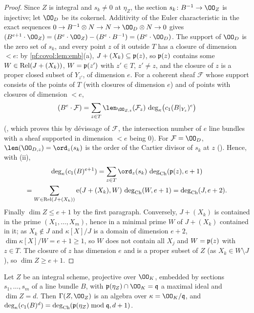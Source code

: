 \begin{proof}
Since $Z$ is integral and $s_k\ne0$ at $\eta_Z$, the section $s_k\colon B^{-1}\to\OO_Z$ is injective; let
$\OO_D$ be its cokernel. Additivity of the Euler characteristic in the exact sequences
$0\to B^{-1}\otimes N\to N\to\OO_D\otimes N\to0$ gives
$(B^{e+1}\cdot\OO_Z)=(B^e\cdot\OO_Z)-(B^e\cdot B^{-1})=(B^e\cdot\OO_D)$. The support of $\OO_D$ is the zero
set of $s_k$, and every point $z$ of it outside $T$ has a closure of dimension $<e$: by
\cref{pf:covol:lem:emb}(a), $J+(X_k)\subseteq\mathfrak{p}(z)$, so $\mathfrak{p}(z)$ contains some
$W\in\operatorname{Rel}(J+(X_k))$, $W=\mathfrak{p}(z')$ with $z'\in T$, $z'\ne z$, and the closure of $z$ is a proper
closed subset of $Y_{z'}$, of dimension $e$. For a coherent sheaf $\mathcal F$ whose support consists of
the points of $T$ (with closures of dimension $e$) and of points with closures of dimension $<e$,
\[
(B^e\cdot\mathcal F)=\sum_{z\in T}\len_{\OO_{Z,z}}(\mathcal F_z)\,\deg_\kappa\bigl(c_1(B|_{Y_z})^e\bigr)
\]
(, which proves this by d\'evissage of
$\mathcal F$, the intersection number of $e$ line bundles with a sheaf supported in dimension $<e$
being $0$). For $\mathcal F=\OO_D$, $\len(\OO_{D,z})=\ord_z(s_k)$ is the order of the Cartier divisor
of $s_k$ at $z$ (). Hence, with (ii),
\begin{multline*}
\deg_\kappa(c_1(B)^{e+1})=\sum_{z\in T}\ord_z(s_k)\,\covolCdeg(\covolPt(z),e+1)\\
=\sum_{W\in\covolRel(J+(X_k))}\covolLm(J+(X_k),W)\,\covolCdeg(W,e+1)=\covolCdeg(J,e+2).
\end{multline*}
Finally $\dim Z\le e+1$ by the first paragraph. Conversely, $J+(X_k)$ is contained in the prime
$(X_1,\dots,X_m)$, hence in a minimal prime $W$ of $J+(X_k)$ contained in it; as $X_k\notin J$ and
$\kappa[X]/J$ is a domain of dimension $e+2$, $\dim\kappa[X]/W=e+1\ge1$, so $W$ does not contain all
$X_j$ and $W=\mathfrak{p}(z)$ with $z\in T$. The closure of $z$ has dimension $e$ and is a proper subset of
$Z$ (as $X_k\in W\setminus J$), so $\dim Z\ge e+1$.
\end{proof}

\begin{proposition}\label{pf:covol:prop:vert}
Let $Z$ be an integral scheme, projective over $\OO_K$, embedded by sections $s_1,\dots,s_m$ of a line
bundle $B$, with $\covolPt(\eta_Z)\cap\OO_K=\mathfrak q$ a maximal ideal and $\dim Z=d$. Then
$\Gamma(Z,\OO_Z)$ is an algebra over $\kappa=\OO_K/\mathfrak q$, and
$\deg_\kappa(c_1(B)^d)=\operatorname{deg}_{\mathrm{Ch}}(\mathfrak{p}(\eta_Z)\bmod\mathfrak q,d+1)$.
\end{proposition}

